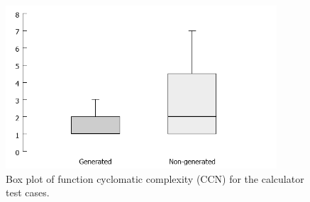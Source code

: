 \begin{figure}[h!]
\centering
\includegraphics[width=0.9\textwidth]{figures/Lizard_Calculator_CCN.png}
\caption{Box plot of function cyclomatic complexity (CCN) for the calculator test cases.}
\label{fig:Lizard_Calculator_CCN}
\end{figure}






